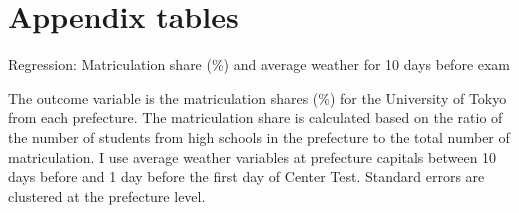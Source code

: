 \documentclass[12pt,letterpaper]{article}
\begin{document}
\setcounter{figure}{0}
\setcounter{table}{0}
\renewcommand\thefigure{\Alph{section}.\arabic{figure}}
\renewcommand\thetable{\Alph{section}.\arabic{table}}
  
\section{Appendix tables}

\begin{table}[H]
  \center
  \caption{Regression: Matriculation share (\%) and average weather for 10 days before exam}
  
  \label{tab:reg_pre10}
  \small
  \begin{tablenotes}
    \item
      The outcome variable is the matriculation shares (\%) for the University of Tokyo from each prefecture.
      The matriculation share is calculated based on the ratio of the number of students from high schools in the prefecture to the total number of matriculation.
      I use average weather variables at prefecture capitals between 10 days before and 1 day before the first day of Center Test.
      Standard errors are clustered at the prefecture level.
  \end{tablenotes}
\end{table}


  
\end{document}
